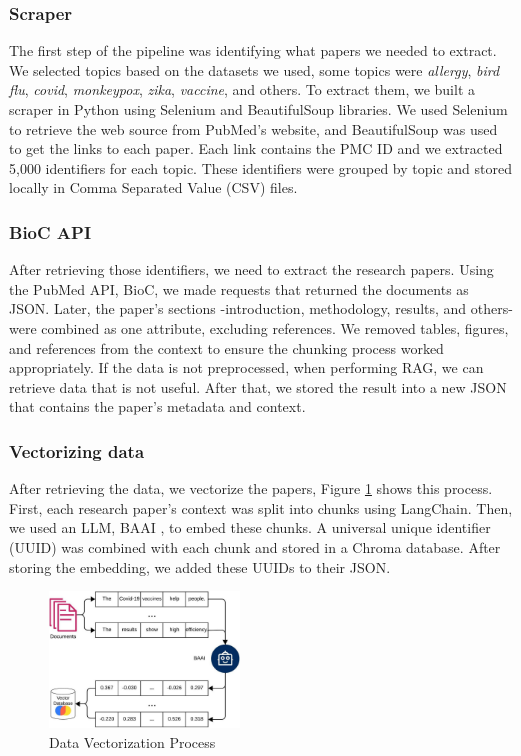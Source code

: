 \subsubsection{Scraper}
The first step of the pipeline was identifying what papers we needed to extract. We selected topics based on the datasets we used, some topics were \textit{allergy}, \textit{bird flu}, \textit{covid}, \textit{monkeypox}, \textit{zika}, \textit{vaccine}, and others. To extract them, we built a scraper in Python using Selenium and BeautifulSoup libraries. We used Selenium to retrieve the web source from PubMed's website, and BeautifulSoup was used to get the links to each paper. Each link contains the PMC ID and we extracted 5,000 identifiers for each topic. These identifiers were grouped by topic and stored locally in Comma Separated Value (CSV) files.

\subsubsection{BioC API}
After retrieving those identifiers, we need to extract the research papers. Using the PubMed API, BioC, we made requests that returned the documents as JSON. Later, the paper's sections -introduction, methodology, results, and others- were combined as one attribute, excluding references. We removed tables, figures, and references from the context to ensure the chunking process worked appropriately. If the data is not preprocessed, when performing RAG, we can retrieve data that is not useful. After that, we stored the result into a new JSON that contains the paper's metadata and context. 

\subsubsection{Vectorizing data}
After retrieving the data, we vectorize the papers, Figure \ref{fig:vector} shows this process. First, each research paper’s context was split into chunks using LangChain. Then, we used an LLM, BAAI \cite{bge_embedding}, to embed these chunks. A universal unique identifier (UUID) was combined with each chunk and stored in a Chroma \cite{chroma} database. After storing the embedding, we added these UUIDs to their JSON. 

\begin{figure}[h]
	\begin{center}
		\includegraphics[width=0.45\textwidth]{figures/Data_vectorization.jpeg} %
	\end{center}
	\caption{Data Vectorization Process} %
	\label{fig:vector}
\end{figure}



